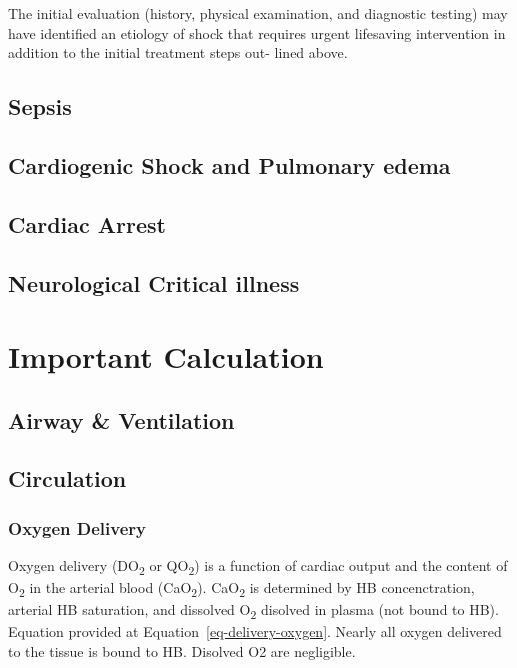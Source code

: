 \documentclass[
  letterpaper,
  DIV=11,
  numbers=noendperiod]{scrreprt}
\begin{document}
The initial evaluation (history, physical examination, and diagnostic
testing) may have identified an etiology of shock that requires urgent
lifesaving intervention in addition to the initial treatment steps out-
lined above.

\subsection{Sepsis}\label{sepsis}

\subsection{Cardiogenic Shock and Pulmonary
edema}\label{cardiogenic-shock-and-pulmonary-edema}

\subsection{Cardiac Arrest}\label{cardiac-arrest}

\subsection{Neurological Critical
illness}\label{neurological-critical-illness}

\section{Important Calculation}\label{important-calculation}

\subsection{Airway \& Ventilation}\label{airway-ventilation}

\subsection{Circulation}\label{circulation}

\subsubsection{Oxygen Delivery}\label{oxygen-delivery}

Oxygen delivery (DO\textsubscript{2} or QO\textsubscript{2}) is a
function of cardiac output and the content of O\textsubscript{2} in the
arterial blood (CaO\textsubscript{2}). CaO\textsubscript{2} is
determined by HB concenctration, arterial HB saturation, and dissolved
O\textsubscript{2} disolved in plasma (not bound to HB). Equation
provided at Equation~\ref{eq-delivery-oxygen}. Nearly all oxygen
delivered to the tissue is bound to HB. Disolved O2 are negligible.
\end{document}
